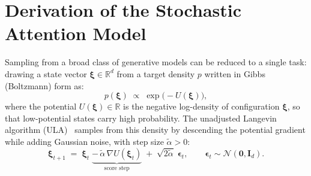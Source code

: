 
\section{Derivation of the Stochastic Attention Model}\label{si:derivation}
Sampling from a broad class of generative models can be reduced to a single task: drawing a state vector $\boldsymbol{\xi}\in\mathbb{R}^d$ from a target density
$p$ written in Gibbs (Boltzmann) form as:
\[
  p(\boldsymbol{\xi}) \;\propto\; \exp\!\bigl(-U(\boldsymbol{\xi})\bigr),
\]
where the potential $U(\boldsymbol{\xi})\in\mathbb{R}$ is the negative log-density of configuration $\boldsymbol{\xi}$, so that low-potential states carry high probability.
The unadjusted Langevin algorithm (ULA)~\cite{robertsTweedieExponentialConvergence1996} samples from this density by descending the
potential gradient while adding Gaussian noise, with step size $\tilde\alpha>0$:
\[
  \boldsymbol{\xi}_{t+1} \;=\;
  \boldsymbol{\xi}_t
  \;\underbrace{-\,\tilde\alpha\,\nabla U(\boldsymbol{\xi}_t)}_{\textstyle\text{score step}}
  \;+\; \sqrt{2\tilde\alpha}\;\boldsymbol{\epsilon}_t,
  \qquad \boldsymbol{\epsilon}_t\sim\mathcal{N}(\mathbf{0},\mathbf{I}_d).
\]

